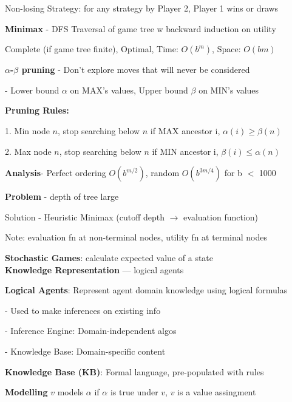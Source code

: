 \documentclass[10pt, a4paper]{article}
\newcommand{\highlight}[1]{{\color{red}\textbf{#1}}}
\newcommand{\red}[1]{{\color{red}#1}}
\newcommand{\green}[1]{{\color{PineGreen}#1}}
\newcommand{\header}[1]{{\normalsize\textbf{#1}}}
\newcommand{\tab}[0]{\hspace*{2mm}}
\begin{document}
\begin{multicols*}{3}
		Non-losing Strategy: for any strategy by Player 2, Player 1 wins or draws

		\textbf{Minimax} - DFS Traversal of game tree w backward induction on utility


		\green{Complete} (if game tree finite), \green{Optimal}, Time: $O(b^m)$, Space: $O(bm)$

		\textbf{$\alpha$-$\beta$ pruning} - Don't explore moves that will never be considered

		- \red{Lower} bound $\alpha$ on \green{MAX's} values, \green{Upper} bound $\beta$ on \red{MIN's} values

		\textbf{Pruning Rules:}

		1. \red{Min} node $n$, stop searching below $n$ if MAX ancestor i, \highlight{$\alpha (i) \geq \beta (n)$}

		2. \green{Max} node $n$, stop searching below $n$ if MIN ancestor i, \highlight{$\beta (i) \leq \alpha (n)$}

		\textbf{Analysis}- Perfect ordering $O(b^{m / 2})$, random $O(b^{3m/4})$ for b $<$ 1000

		\highlight{Problem} - depth of tree large

		\green{Solution} - Heuristic Minimax (cutoff depth $\rightarrow$ evaluation function)

		\red{Note}: evaluation fn at non-terminal nodes, utility fn at terminal nodes

		\textbf{Stochastic Games}: calculate expected value of a state\\

		\header{Knowledge Representation} --- logical agents

		\textbf{Logical Agents}: Represent agent \green{domain knowledge} using \green{logical formulas}

		- Used to make inferences on existing info

		- Inference Engine: \green{Domain-independent} algos

		- Knowledge Base: \red{Domain-specific} content

		\textbf{Knowledge Base (KB)}: Formal language, pre-populated with rules



		\textbf{Modelling}
		$v$ \red{models} $\alpha$ if $\alpha$ is \green{true} under $v$, $v$ is a value assingment 


\end{multicols*}
\end{document}
